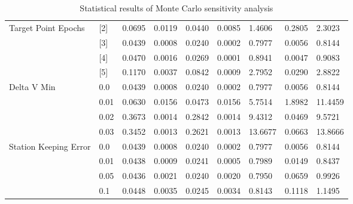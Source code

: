 \begin{table}[h!]
\begin{tabular}{lllllllll}
Target Point Epochs & [2] & 0.0695 & 0.0119 & 0.0440 & 0.0085 & 1.4606 & 0.2805 & 2.3023 \\ 
 & [3] & 0.0439 & 0.0008 & 0.0240 & 0.0002 & 0.7977 & 0.0056 & 0.8144 \\ 
 & [4] & 0.0470 & 0.0016 & 0.0269 & 0.0001 & 0.8941 & 0.0047 & 0.9083 \\ 
 & [5] & 0.1170 & 0.0037 & 0.0842 & 0.0009 & 2.7952 & 0.0290 & 2.8822 \\ 
Delta V Min & 0.0 & 0.0439 & 0.0008 & 0.0240 & 0.0002 & 0.7977 & 0.0056 & 0.8144 \\ 
 & 0.01 & 0.0630 & 0.0156 & 0.0473 & 0.0156 & 5.7514 & 1.8982 & 11.4459 \\ 
 & 0.02 & 0.3673 & 0.0014 & 0.2842 & 0.0014 & 9.4312 & 0.0469 & 9.5721 \\ 
 & 0.03 & 0.3452 & 0.0013 & 0.2621 & 0.0013 & 13.6677 & 0.0663 & 13.8666 \\ 
Station Keeping Error & 0.0 & 0.0439 & 0.0008 & 0.0240 & 0.0002 & 0.7977 & 0.0056 & 0.8144 \\ 
 & 0.01 & 0.0438 & 0.0009 & 0.0241 & 0.0005 & 0.7989 & 0.0149 & 0.8437 \\ 
 & 0.05 & 0.0436 & 0.0021 & 0.0240 & 0.0020 & 0.7950 & 0.0659 & 0.9926 \\ 
 & 0.1 & 0.0448 & 0.0035 & 0.0245 & 0.0034 & 0.8143 & 0.1118 & 1.1495 \\ 
\end{tabular}
\caption{Statistical results of Monte Carlo sensitivity analysis}
\label{tab:SensitivityAnalysis}
\end{table}